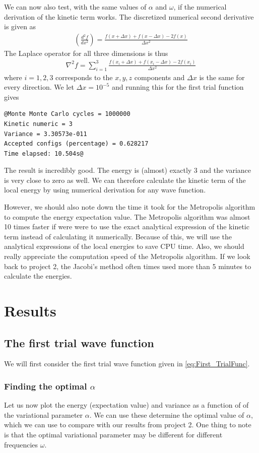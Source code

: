 \documentclass[12pt]{article}
\begin{document}
We can now also test, with the same values of $\alpha$ and $\omega$, if the numerical derivation of the kinetic term works. The discretized numerical second derivative is given as
\begin{align*}
\left(\frac{d^2f}{dx^2}\right) = \frac{f(x + \Delta x) + f(x - \Delta x) - 2f(x)}{\Delta x^2}
\end{align*}
The Laplace operator for all three dimensions is thus
\begin{align*}
\nabla^2 f = \displaystyle \sum_{i=1}^3 \frac{f(x_i + \Delta x) + f(x_i - \Delta x) - 2f(x_i)}{\Delta x^2} 
\end{align*}
where $i=1,2,3$ corresponds to the $x,y,z$ components and $\Delta x$ is the same for every direction. We let $\Delta x = 10^{-5}$ and running this for the first trial function gives
\begin{lstlisting}
@Monte Monte Carlo cycles = 1000000
Kinetic numeric = 3
Variance = 3.30573e-011
Accepted configs (percentage) = 0.628217
Time elapsed: 10.504s@
\end{lstlisting}
The result is incredibly good. The energy is (almost) exactly 3 and the variance is very close to zero as well. We can therefore calculate the kinetic term of the local energy by using numerical derivation for any wave function.

However, we should also note down the time it took for the Metropolis algorithm to compute the energy expectation value. The Metropolis algorithm was almost 10 times faster if were were to use the exact analytical expression of the kinetic term instead of calculating it numerically. Because of this, we will use the analytical expressions of the local energies to save CPU time. Also, we should really appreciate the computation speed of the Metropolis algorithm. If we look back to project 2, the Jacobi's method often times used more than  5 minutes to calculate the energies.

\section{Results}\label{section:results}
\subsection{The first trial wave function}
We will first consider the first trial wave function given in \ref{eq:First_TrialFunc}.
\subsubsection{Finding the optimal $\alpha$}
Let us now plot the energy (expectation value) and variance as a function of of the variational parameter $\alpha$. We can use these determine the optimal value of $\alpha$, which we can use to compare with our results from project 2. One thing to note is that the optimal variational parameter may be different for different frequencies $\omega$.
\end{document}
